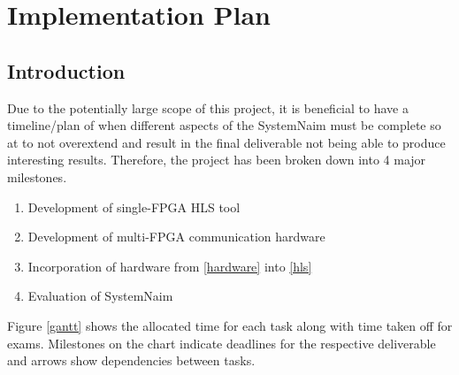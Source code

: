 \chapter{Implementation Plan}

\section{Introduction}

Due to the potentially large scope of this project, it is beneficial to have a timeline/plan of when different aspects of the SystemNaim must be complete so at to not overextend and result in the final deliverable not being able to produce interesting results. Therefore, the project has been broken down into 4 major milestones.


\begin{enumerate}[label=\textbf{\arabic*.},ref=\textbf{\arabic*}]
    \item \label{hls} Development of single-FPGA HLS tool
    \item \label{hardware} Development of multi-FPGA communication hardware
    \item \label{multi-HLS}Incorporation of hardware from \ref{hardware} into \ref{hls}
    \item \label{Eval}Evaluation of SystemNaim
\end{enumerate}


Figure \ref{gantt} shows the allocated time for each task along with time taken off for exams. Milestones on the chart indicate deadlines for the respective deliverable and arrows show dependencies between tasks.

